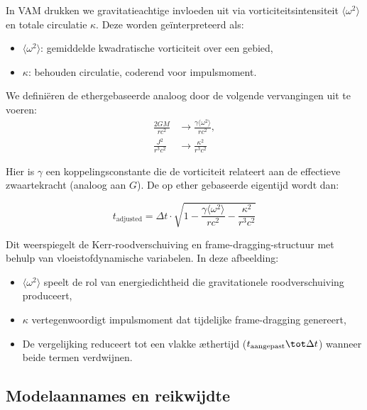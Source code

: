 In VAM drukken we gravitatieachtige invloeden uit via vorticiteitsintensiteit $\langle \omega^2 \rangle$ en totale circulatie $\kappa$. Deze worden geïnterpreteerd als:
\begin{itemize}
\item $\langle \omega^2 \rangle$: gemiddelde kwadratische vorticiteit over een gebied,
\item $\kappa$: behouden circulatie, coderend voor impulsmoment.
\end{itemize}

We definiëren de ethergebaseerde analoog door de volgende vervangingen uit te voeren:
\begin{equation}
\begin{aligned}
\frac{2GM}{rc^2} &\rightarrow \frac{\gamma \langle \omega^2 \rangle}{rc^2}, \\
\frac{J^2}{r^3c^2} &\rightarrow \frac{\kappa^2}{r^3c^2}
\end{aligned}
\label{eq:Kerr_replacements}
\end{equation}

Hier is $\gamma$ een koppelingsconstante die de vorticiteit relateert aan de effectieve zwaartekracht (analoog aan $G$). De op ether gebaseerde eigentijd wordt dan:

\begin{equation}
\boxed{t_{\text{adjusted}} = \Delta t \cdot \sqrt{1 - \frac{\gamma \langle \omega^2 \rangle}{rc^2} - \frac{\kappa^2}{r^3c^2}}}
\label{eq:Kerr_time_dilation_ae}
\end{equation}

Dit weerspiegelt de Kerr-roodverschuiving en frame-dragging-structuur met behulp van vloeistofdynamische variabelen. In deze afbeelding:
\begin{itemize}
\item $\langle \omega^2 \rangle$ speelt de rol van energiedichtheid die gravitationele roodverschuiving produceert,
\item $\kappa$ vertegenwoordigt impulsmoment dat tijdelijke frame-dragging genereert,
\item De vergelijking reduceert tot een vlakke æthertijd ($t_{\text{aangepast}} \tot \Delta t$) wanneer beide termen verdwijnen.
\end{itemize}

\subsection{Modelaannames en reikwijdte}

